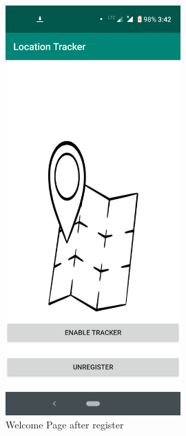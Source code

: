 \documentclass{article}
\begin{document}
\begin{itemize}
\begin{figure}[!tbp]
\begin{minipage}[b]{0.4\textwidth}
    \includegraphics[width=0.6\textwidth]{images/Enabletracker.png}
    \caption{Welcome Page after register}
  \end{minipage}
  \hfill
  \begin{minipage}[b]{0.4\textwidth}
  \centering

\end{minipage}
\end{figure}
\end{itemize}
\end{document}
